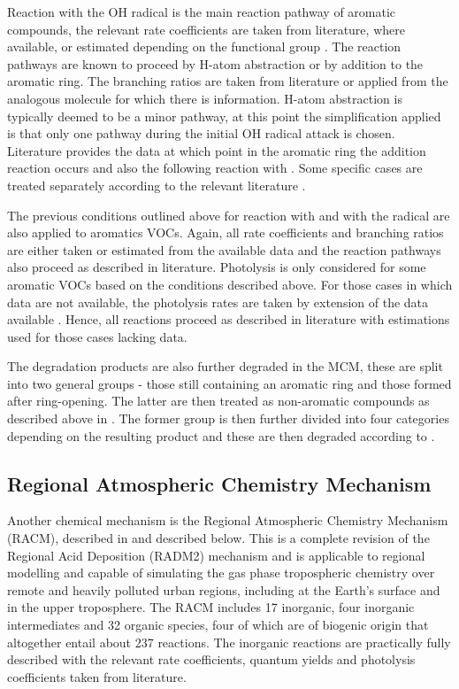 Reaction with the OH radical is the main reaction pathway of aromatic compounds, the relevant rate coefficients are taken from 
literature, where available, or estimated depending on the functional group \citep{Jenkin:2003}. The reaction pathways are known
to proceed by H-atom abstraction or by addition to the aromatic ring. The branching ratios are taken from literature or applied
from the analogous molecule for which there is information. H-atom abstraction is typically deemed to be a minor pathway, at 
this point the simplification applied is that only one pathway during the initial OH radical attack is chosen. Literature 
provides the data at which point in the aromatic ring the addition reaction occurs and also the following reaction with 
. Some specific cases are treated separately according to the relevant literature \citep{Jenkin:2003}.

The previous conditions outlined above for reaction with  and with the  radical are also applied to aromatics 
VOCs. Again, all rate coefficients and branching ratios are either taken or estimated from the available data and the reaction 
pathways also proceed as described in literature. Photolysis is only considered for some aromatic VOCs based on the conditions 
described above. For those cases in which data are not available, the photolysis rates are taken by extension of the data 
available \citep{Jenkin:2003}. Hence, all reactions proceed as described in literature with estimations used for those cases 
lacking data.

The degradation products are also further degraded in the MCM, these are split into two general groups - those still containing
an aromatic ring and those formed after ring-opening. The latter are then treated as non-aromatic compounds as described above 
in \citep{Saunders:2003}. The former group is then further divided into four categories depending on the resulting product and 
these are then degraded according to \citep{Jenkin:2003}.

\subsection{Regional Atmospheric Chemistry Mechanism}
Another chemical mechanism is the Regional Atmospheric Chemistry Mechanism (RACM), described in \citep{Stockwell:1997} and 
described below. This is a complete revision of the Regional Acid Deposition (RADM2) mechanism and is applicable to regional 
modelling and capable of simulating the gas phase tropospheric chemistry over remote and heavily polluted urban regions, 
including at the Earth's surface and in the upper troposphere. The RACM includes 17 inorganic, four inorganic intermediates and
32 organic species, four of which are of biogenic origin that altogether entail about 237 reactions. The inorganic reactions 
are practically fully described with the relevant rate coefficients, quantum yields and photolysis coefficients taken from 
literature.

